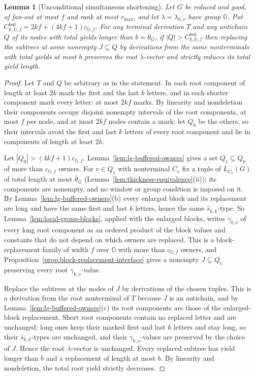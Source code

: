 \documentclass[11pt]{article}
\numberwithin{equation}{section}
\theoremstyle{plain}
\newtheorem{lemma}[theorem]{Lemma}
\theoremstyle{definition}
\theoremstyle{remark}
\theoremstyle{plain}
\begin{document}
\begin{lemma}[Unconditional simultaneous shortening]
\label{lem:lg-unconditional-shortening}
Let $G$ be reduced and good, of fan-out at most $f$ and rank at most
$r_{\max}$, and let $\lambda=\lambda_{k,\nu}$ have group $\mathbb G$.
Put $C^{\mathrm{buf}}_{k,\mathbb G,f}=2kf+(4kf+1)c_{\mathbb G,f}$.
For any terminal derivation $T$ and any antichain $Q$ of its nodes
with total yields longer than $b=\bar\theta_G$, if
$|Q|>C^{\mathrm{buf}}_{k,\mathbb G,f}$ then replacing the subtrees
at some nonempty $J\subseteq Q$ by derivations from the same
nonterminals with total yields at most $b$ preserves the root
$\lambda$-vector and strictly reduces its total yield length.
\end{lemma}

\begin{proof}
Let $T$ and $Q$ be arbitrary as in the statement.
In each root component of length at least $2k$ mark the first
and the last $k$ letters, and in each shorter component mark every letter: at
most $2kf$ marks.   By linearity and
nondeletion their components occupy disjoint nonempty intervals of the root
components, at most $f$ per node, and at most $2kf$ nodes contain a mark; let
$Q_0$ be the others, so their intervals avoid the first and last $k$ letters of
every root component and lie in components of length at least $2k$.

Let $|Q_0|>(4kf+1)c_{{\mathbb G},f}$.  Lemma~\ref{lem:lg-buffered-owners} gives a set
$Q_1\subseteq Q_0$ of more than $c_{{\mathbb G},f}$ owners.  For $v\in Q_1$ with nonterminal
$C_v$ fix a tuple of $L_{C_v}(G)$ of total length at most $\bar\theta_G$
(Lemma~\ref{lem:thickness-equivalence}(ii)); its components are nonempty, and no
window or group condition is imposed on it.  By
Lemma~\ref{lem:lg-buffered-owners}(b) every enlarged block and its replacement
are long and have the same first and last $k$ letters, hence the same
$\widehat s_{k,k}$-type.  So Lemma~\ref{lem:local-group-blocks}, applied with the
enlarged blocks, writes $\gamma_{k,\nu}$ of every long root component as an
ordered product of the block values and constants that do not depend on which
owners are replaced.  This is a block-replacement family of width $f$ over ${\mathbb G}$
with more than $c_{{\mathbb G},f}$ owners, and
Proposition~\ref{prop:block-replacement-interface} gives a nonempty $J\subseteq Q_1$
preserving every root $\gamma_{k,\nu}$-value.

Replace the subtrees at the nodes of $J$ by derivations of the chosen tuples.
This is a derivation from the root nonterminal of $T$ because
$J$ is an antichain, and by
Lemma~\ref{lem:lg-buffered-owners}(c) its root components are those of the
enlarged-block replacement.  Short root components contain no replaced letter
and are unchanged; long ones keep their marked first and last $k$ letters and
stay long, so their $\widehat s_{k,k}$-types are unchanged, and their
$\gamma_{k,\nu}$-values are preserved by the choice of $J$.  Hence the root
$\lambda$-vector is unchanged.
Every replaced subtree has yield longer than $b$
and a replacement of length at most $b$. By linearity and
nondeletion, the total root yield strictly decreases.
\end{proof}
\end{document}
